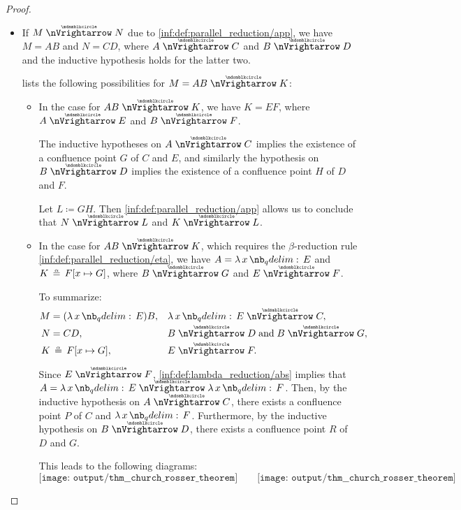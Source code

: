 \begin{proof}
\begin{itemize}
    \item If \( M \ppred N \) due to \ref{inf:def:parallel_reduction/app}, we have \( M = AB \) and \( N = CD \), where \( A \ppred C \) and \( B \ppred D \) and the inductive hypothesis holds for the latter two.

     lists the following possibilities for \( M = AB \ppred K \):
    \begin{itemize}
      \item In the case  for \( AB \ppred K \), we have \( K = EF \), where \( A \ppred E \) and \( B \ppred F \).

      The inductive hypotheses on \( A \ppred C \) implies the existence of a confluence point \( G \) of \( C \) and \( E \), and similarly the hypothesis on \( B \ppred D \) implies the existence of a confluence point \( H \) of \( D \) and \( F \).

      Let \( L \coloneqq GH \). Then \ref{inf:def:parallel_reduction/app} allows us to conclude that \( N \ppred L \) and \( K \ppred L \).

      \item In the case  for \( AB \ppred K \), which requires the \( \beta \)-reduction rule \ref{inf:def:parallel_reduction/eta}, we have \( A = \qabs x E \) and \( K \aequiv F[x \mapsto G] \), where \( B \ppred G \) and \( E \ppred F \).

      To summarize:
      \begin{align*}
        M &= (\qabs x E) B,           &&\qabs x E \ppred C,            \\
        N &= C D,                     &&B \ppred D \T{and} B \ppred G, \\
        K &\aequiv F[x \mapsto G],    &&E \ppred F.
      \end{align*}

      Since \( E \ppred F \), \ref{inf:def:lambda_reduction/abs} implies that \( A = \qabs x E \ppred \qabs x F \). Then, by the inductive hypothesis on \( A \ppred C \), there exists a confluence point \( P \) of \( C \) and \( \qabs x F \). Furthermore, by the inductive hypothesis on \( B \ppred D \), there exists a confluence point \( R \) of \( D \) and \( G \).

      This leads to the following diagrams:
      \begin{equation*}
        \texttt{[image: output/thm\_\_church\_rosser\_theorem]}
        \quad\quad
        \texttt{[image: output/thm\_\_church\_rosser\_theorem]}
      \end{equation*}


\end{itemize}
\end{itemize}
\end{proof}
